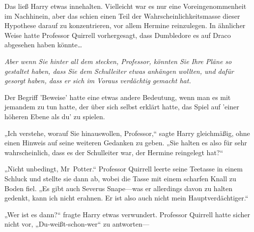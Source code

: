 Das ließ Harry etwas innehalten. Vielleicht war es nur eine Voreingenommenheit im Nachhinein, aber das schien einen Teil der Wahrscheinlichkeitsmasse dieser Hypothese darauf zu konzentrieren, vor allem Hermine reinzulegen. In ähnlicher Weise hatte Professor Quirrell vorhergesagt, dass Dumbledore es auf Draco abgesehen haben könnte…

\emph{Aber wenn Sie hinter all dem stecken, Professor, könnten Sie Ihre Pläne so gestaltet haben, dass Sie dem Schulleiter etwas anhängen wollten, und dafür gesorgt haben, dass er sich im Voraus verdächtig gemacht hat.}

Der Begriff 'Beweise' hatte eine etwas andere Bedeutung, wenn man es mit jemandem zu tun hatte, der über sich selbst erklärt hatte, das Spiel auf 'einer höheren Ebene als du' zu spielen.

„Ich verstehe, worauf Sie hinauswollen, Professor,“ sagte Harry gleichmäßig, ohne einen Hinweis auf seine weiteren Gedanken zu geben. „Sie halten es also für sehr wahrscheinlich, dass es der Schulleiter war, der Hermine reingelegt hat?“

„Nicht unbedingt, Mr~Potter.“ Professor Quirrell leerte seine Teetasse in einem Schluck und stellte sie dann ab, wobei die Tasse mit einem scharfen Knall zu Boden fiel. „Es gibt auch Severus Snape—was er allerdings davon zu halten gedenkt, kann ich nicht erahnen. Er ist also auch nicht mein Hauptverdächtiger.“

„Wer ist es dann?“ fragte Harry etwas verwundert. Professor Quirrell hatte sicher nicht vor, „Du-weißt-schon-wer“ zu antworten—

